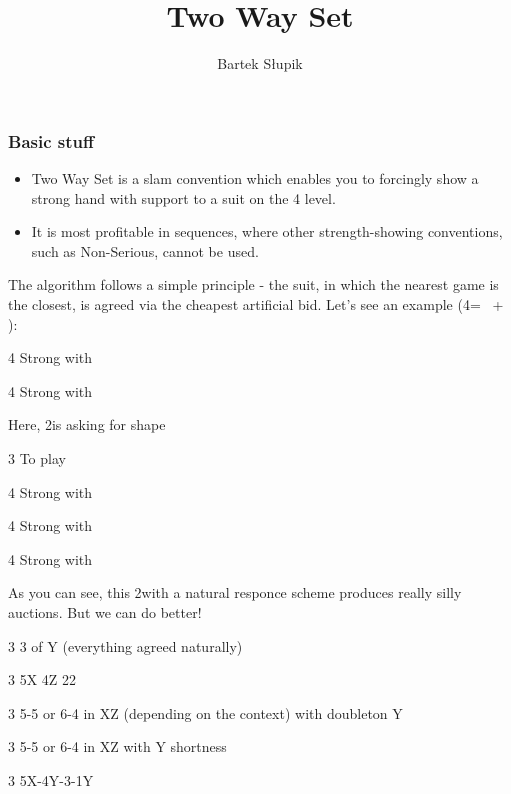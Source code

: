 \documentclass[12pt, a4paper]{article}
\title{Two Way Set}
\author{Bartek Słupik}
\begin{document}
\maketitle

 
\subsubsection*{Basic stuff}

\begin{itemize}
    \item Two Way Set is a slam convention which enables you to forcingly show a strong hand with support to a suit on
    the 4 level.
    \item It is most profitable in sequences, where other strength-showing conventions, such as Non-Serious, cannot 
    be used.
\end{itemize}

The algorithm follows a simple principle - the suit, in which the nearest game is the closest, is agreed via the cheapest
artificial bid. Let's see an example (4\clubs = \spades\ + \clubs):

\begin{compoptions}[4]
    \item[4\diams] Strong with \spades
    \item[4\hearts] Strong with \clubs  
\end{compoptions}

Here, 2\nt is \gf asking for shape

\begin{options}[2]
    \item[3\nt] To play
    \item[4\clubs] Strong with \spades
    \item[4\diams] Strong with \clubs
    \item[4\hearts] Strong with \diams   
\end{options}

As you can see, this 2\nt with a natural responce scheme produces really silly auctions. 
But we can do better!

\begin{options}
    \item[3\clubs] 3 of Y (everything agreed naturally)
    \item[3\diams] 5X 4Z 22
    \item[3\hearts] 5-5 or 6-4 in XZ (depending on the context) with doubleton Y
    \item[3\spades] 5-5 or 6-4 in XZ with Y shortness
    \item[3\nt] 5X-4Y-3-1Y    
\end{options}
\end{document}
